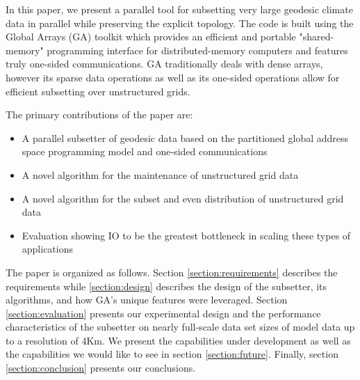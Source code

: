 In this paper, we present a parallel tool for subsetting very large geodesic
climate data in parallel while preserving the explicit topology.  The code is
built using the Global Arrays (GA) toolkit\cite{GA} which provides an
efficient and portable "shared-memory" programming interface for
distributed-memory computers and features truly one-sided communications.  GA
traditionally deals with dense arrays, however its sparse data operations as
well as its one-sided operations allow for efficient subsetting over
unstructured grids.

The primary contributions of the paper are:
\begin{itemize}
\item A parallel subsetter of geodesic data based on the partitioned global address space programming model and one-sided communications
\item A novel algorithm for the maintenance of unstructured grid data
\item A novel algorithm for the subset and even distribution of unstructured grid data
\item Evaluation showing IO to be the greatest bottleneck in scaling these types of applications
\end{itemize}

The paper is organized as follows.  Section \ref{section:requirements}
describes the requirements while \ref{section:design} describes the design of
the subsetter, its algorithms, and how GA's unique features were leveraged.
Section \ref{section:evaluation} presents our experimental design and the
performance characteristics of the subsetter on nearly full-scale data set
sizes of model data up to a resolution of 4Km.  We present the capabilities
under development as well as the capabilities we would like to see in section
\ref{section:future}.  Finally, section \ref{section:conclusion} presents our
conclusions.
